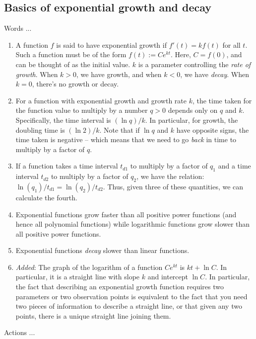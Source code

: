 \documentclass[10pt]{amsart}
\begin{document}
\subsection{Basics of exponential growth and decay}

Words ...

\begin{enumerate}
\item A function $f$ is said to have exponential growth if $f'(t) =
  kf(t)$ for all $t$. Such a function must be of the form $f(t) :=
  Ce^{kt}$. Here, $C = f(0)$, and can be thought of as the initial
  value. $k$ is a parameter controlling the {\em rate of growth}. When
  $k > 0$, we have growth, and when $k < 0$, we have {\em decay}. When
  $k = 0$, there's no growth or decay.
\item For a function with exponential growth and growth rate $k$, the
  time taken for the function value to multiply by a number $q > 0$
  depends only on $q$ and $k$. Specifically, the time interval is
  $(\ln q)/k$. In particular, for growth, the doubling time is $(\ln
  2)/k$. Note that if $\ln q$ and $k$ have opposite signs, the time
  taken is negative -- which means that we need to go {\em back} in
  time to multiply by a factor of $q$.
\item If a function takes a time interval $t_{d1}$ to multiply by a
  factor of $q_1$ and a time interval $t_{d2}$ to multiply by a factor
  of $q_2$, we have the relation: $\ln(q_1)/t_{d1} =
  \ln(q_2)/t_{d2}$. Thus, given three of these quantities, we can
  calculate the fourth.
\item Exponential functions grow faster than all positive power
  functions (and hence all polynomial functions) while logarithmic
  functions grow slower than all positive power functions.
\item Exponential functions {\em decay} slower than linear functions.
\item {\em Added}: The graph of the logarithm of a function $Ce^{kt}$
  is $kt + \ln C$. In particular, it is a straight line with slope $k$
  and intercept $\ln C$. In particular, the fact that describing an
  exponential growth function requires two parameters or two
  observation points is equivalent to the fact that you need two
  pieces of information to describe a straight line, or that given any
  two points, there is a unique straight line joining them.
\end{enumerate}

Actions ...
\end{document}
